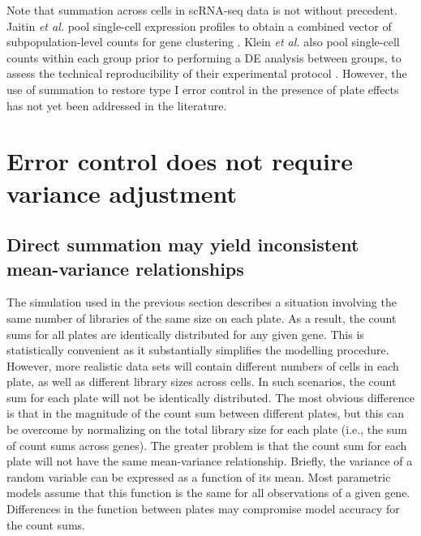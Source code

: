 \documentclass[oupdraft]{bio}
\begin{document}
Note that summation across cells in scRNA-seq data is not without precedent.
Jaitin \textit{et al.} pool single-cell expression profiles to obtain a combined vector of subpopulation-level counts for gene clustering \citep{jaitin2014massively}.
Klein \textit{et al.} also pool single-cell counts within each group prior to performing a DE analysis between groups,
    to assess the technical reproducibility of their experimental protocol \citep{klein2015droplet}.
However, the use of summation to restore type I error control in the presence of plate effects has not yet been addressed in the literature.

\section{Error control does not require variance adjustment}

\subsection{Direct summation may yield inconsistent mean-variance relationships}
The simulation used in the previous section describes a situation involving the same number of libraries of the same size on each plate.
As a result, the count sums for all plates are identically distributed for any given gene.
This is statistically convenient as it substantially simplifies the modelling procedure.
However, more realistic data sets will contain different numbers of cells in each plate, as well as different library sizes across cells.
In such scenarios, the count sum for each plate will not be identically distributed.
The most obvious difference is that in the magnitude of the count sum between different plates, 
    but this can be overcome by normalizing on the total library size for each plate (i.e., the sum of count sums across genes).
The greater problem is that the count sum for each plate will not have the same mean-variance relationship.
Briefly, the variance of a random variable can be expressed as a function of its mean.
Most parametric models assume that this function is the same for all observations of a given gene.
Differences in the function between plates may compromise model accuracy for the count sums.
\end{document}
